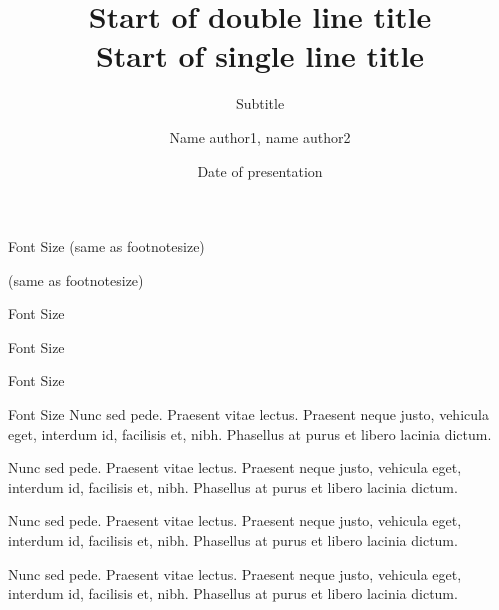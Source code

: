 \documentclass[english,notes]{beamer}
\title{Start of double line title\\Start of single line title}
\subtitle{Subtitle}
\date{Date of presentation}
\author{Name author1, name author2}
\begin{document}
\newcommand{\testsize}[1]{#1 \string#1}
\begin{frame}{Font Size}
    \testsize{\tiny} (same as footnotesize)\par
    \testsize{\scriptsize} (same as footnotesize)\par
    \testsize{\footnotesize}\par
    \testsize{\small}\par
    \testsize{\normalsize}\par
    \testsize{\large}\par
    \testsize{\Large}\par
    \testsize{\LARGE}\par
    \testsize{\huge}\par
    \testsize{\Huge}
\end{frame}

\renewcommand{\testsize}[1]{#1 \string#1 \lipsum[66]}
\begin{frame}{Font Size}
    \testsize{\tiny}\par
    \testsize{\scriptsize}\par
    \testsize{\footnotesize}\par
    \testsize{\small}\par
    \testsize{\normalsize}\par
    \testsize{\large}
\end{frame}

\begin{frame}{Font Size}
    \testsize{\Large}
\end{frame}

\renewcommand{\testsize}[1]{#1 \string#1 \lipsum[66]\par #1 \string#1 \lipsum[66]}
\begin{frame}{Font Size}
    \testsize{\tiny}\par
    \testsize{\scriptsize}\par
    \testsize{\footnotesize}\par
    \testsize{\small}
\end{frame}

\renewcommand{\testsize}[1]{#1 \string#1 Nunc sed pede. Praesent vitae lectus. Praesent neque justo, vehicula eget, interdum id, facilisis et, nibh.
Phasellus at purus et libero lacinia dictum.\par #1 \string#1 Nunc sed pede. Praesent vitae lectus. Praesent neque justo, vehicula eget, interdum id, facilisis et, nibh.
Phasellus at purus et libero lacinia dictum.}
\begin{frame}{Font Size}
    \testsize{\normalsize}\par
    \testsize{\large}
\end{frame}
\end{document}
